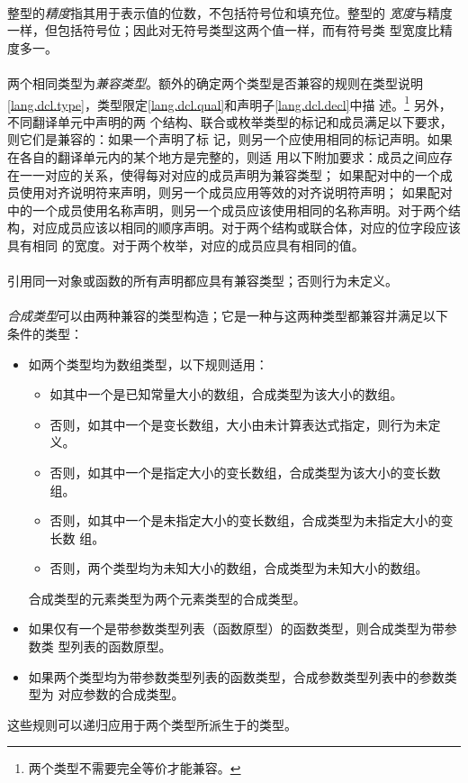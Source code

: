 {\paragraph{}
整型的\textit{精度}指其用于表示值的位数，不包括符号位和填充位。整型的
\textit{宽度}与精度一样，但包括符号位；因此对无符号类型这两个值一样，而有符号类
型宽度比精度多一。

\paragraph{}
两个相同类型为\textit{兼容类型}。额外的确定两个类型是否兼容的规则在类型说明
\ref{lang.dcl.type}，类型限定\ref{lang.dcl.qual}和声明子\ref{lang.dcl.decl}中描
述。\footnote{两个类型不需要完全等价才能兼容。} 另外，不同翻译单元中声明的两
个结构、联合或枚举类型的标记和成员满足以下要求，则它们是兼容的：如果一个声明了标
记，则另一个应使用相同的标记声明。如果在各自的翻译单元内的某个地方是完整的，则适
用以下附加要求：成员之间应存在一一对应的关系，使得每对对应的成员声明为兼容类型；
如果配对中的一个成员使用对齐说明符来声明，则另一个成员应用等效的对齐说明符声明；
如果配对中的一个成员使用名称声明，则另一个成员应该使用相同的名称声明。对于两个结
构，对应成员应该以相同的顺序声明。对于两个结构或联合体，对应的位字段应该具有相同
的宽度。对于两个枚举，对应的成员应具有相同的值。

\paragraph{}
引用同一对象或函数的所有声明都应具有兼容类型；否则行为未定义。

\paragraph{}
\textit{合成类型}可以由两种兼容的类型构造；它是一种与这两种类型都兼容并满足以下
条件的类型：
\begin{itemize}
  \item{如两个类型均为数组类型，以下规则适用：
    \begin{itemize}
      \item{如其中一个是已知常量大小的数组，合成类型为该大小的数组。}
      \item{否则，如其中一个是变长数组，大小由未计算表达式指定，则行为未定义。}
      \item{否则，如其中一个是指定大小的变长数组，合成类型为该大小的变长数组。}
      \item{否则，如其中一个是未指定大小的变长数组，合成类型为未指定大小的变长数
        组。}
      \item{否则，两个类型均为未知大小的数组，合成类型为未知大小的数组。}
    \end{itemize}
    合成类型的元素类型为两个元素类型的合成类型。}
  \item{如果仅有一个是带参数类型列表（函数原型）的函数类型，则合成类型为带参数类
    型列表的函数原型。}
  \item{如果两个类型均为带参数类型列表的函数类型，合成参数类型列表中的参数类型为
    对应参数的合成类型。}
\end{itemize}
这些规则可以递归应用于两个类型所派生于的类型。

}
